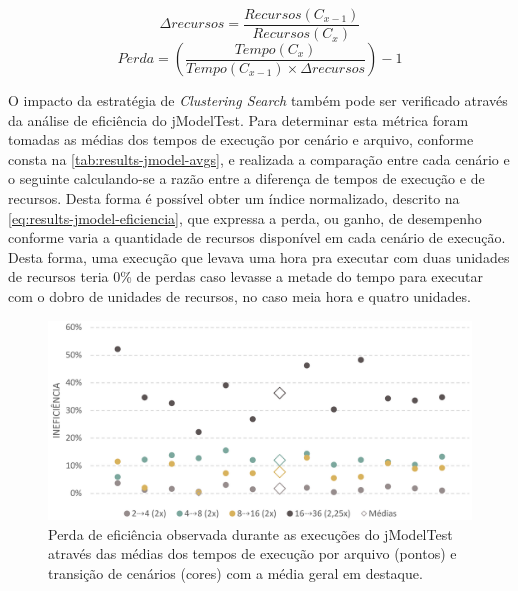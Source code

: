 \documentclass[english,brazilian]{UNISINOSmonografia} %
\newcommand\defaultFigureWidth{0.9}
\begin{document}
\begin{equation}
\Delta{recursos} = \dfrac{Recursos(C_{x-1})}{Recursos(C_{x})}
\end{equation}
\begin{equation}\label{eq:results-jmodel-eficiencia}
Perda = 
\left(
	\dfrac
		{Tempo(C_{x})}
		{Tempo(C_{x-1}) \times \Delta{recursos}}
\right)-1
\end{equation}


O impacto da estratégia de \textit{Clustering Search} também pode ser verificado através da análise de eficiência do jModelTest.
%
Para determinar esta métrica foram tomadas as médias dos tempos de execução por cenário e arquivo, conforme consta na \autoref{tab:results-jmodel-avgs}, e realizada a comparação entre cada cenário e o seguinte calculando-se a razão entre a diferença de tempos de execução e de recursos.
%
Desta forma é possível obter um índice normalizado, descrito na \autoref{eq:results-jmodel-eficiencia}, que expressa a perda, ou ganho, de desempenho conforme varia a quantidade de recursos disponível em cada cenário de execução.
%
Desta forma, uma execução que levava uma hora pra executar com duas unidades de recursos teria 0\% de perdas caso levasse a metade do tempo para executar com o dobro de unidades de recursos, no caso meia hora e quatro unidades.



\begin{figure}[bt]
	\centering%
	\begin{minipage}{\defaultFigureWidth\textwidth}
		\caption{Perda de eficiência observada durante as execuções do jModelTest através das médias dos tempos de execução por arquivo (pontos) e transição de cenários (cores) com a média geral em destaque.}
		\label{fig:results-jmodel-eficiencia}
		\vspace{1ex}
		\includegraphics[width=\textwidth]{results-jmodel-eficiencia}
	\end{minipage}
\end{figure}
\end{document}
